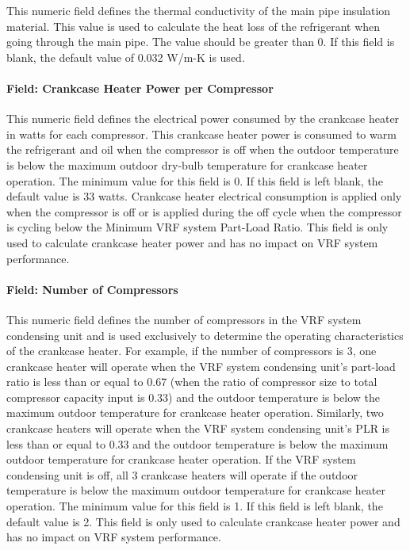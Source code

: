 This numeric field defines the thermal conductivity of the main pipe insulation material. This value is used to calculate the heat loss of the refrigerant when going through the main pipe. The value should be greater than 0. If this field is blank, the default value of 0.032 W/m-K is used.

\paragraph{Field: Crankcase Heater Power per Compressor}

This numeric field defines the electrical power consumed by the crankcase heater in watts for each compressor. This crankcase heater power is consumed to warm the refrigerant and oil when the compressor is off when the outdoor temperature is below the maximum outdoor dry-bulb temperature for crankcase heater operation. The minimum value for this field is 0. If this field is left blank, the default value is 33 watts. Crankcase heater electrical consumption is applied only when the compressor is off or is applied during the off cycle when the compressor is cycling below the Minimum VRF system Part-Load Ratio. This field is only used to calculate crankcase heater power and has no impact on VRF system performance.

\paragraph{Field: Number of Compressors}

This numeric field defines the number of compressors in the VRF system condensing unit and is used exclusively to determine the operating characteristics of the crankcase heater. For example, if the number of compressors is 3, one crankcase heater will operate when the VRF system condensing unit's part-load ratio is less than or equal to 0.67 (when the ratio of compressor size to total compressor capacity input is 0.33) and the outdoor temperature is below the maximum outdoor temperature for crankcase heater operation. Similarly, two crankcase heaters will operate when the VRF system condensing unit's PLR is less than or equal to 0.33 and the outdoor temperature is below the maximum outdoor temperature for crankcase heater operation. If the VRF system condensing unit is off, all 3 crankcase heaters will operate if the outdoor temperature is below the maximum outdoor temperature for crankcase heater operation. The minimum value for this field is 1. If this field is left blank, the default value is 2. This field is only used to calculate crankcase heater power and has no impact on VRF system performance.

